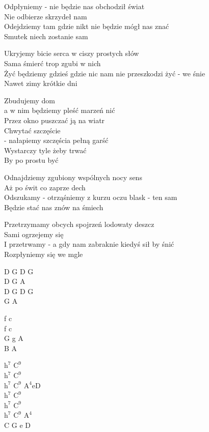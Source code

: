 
\begin{text}
    Odpłyniemy - nie będzie nas obchodził świat\\
    Nie odbierze skrzydeł nam\\
    Odejdziemy tam gdzie nikt nie będzie mógł nas znać\\
    Smutek niech zostanie sam

    Ukryjemy bicie serca w ciszy prostych słów\\
    Sama śmierć trop zgubi w nich\\
    Żyć będziemy gdzieś gdzie nic nam nie przeszkodzi żyć - we śnie\\
    Nawet zimy krótkie dni

    \vin Zbudujemy dom\\
    \vin a w nim będziemy pleść marzeń nić\\
    \vin Przez okno puszczać ją na wiatr\\
    \vin Chwytać szczęście\\
    \vin - nałapiemy szczęścia pełną garść\\
    \vin Wystarczy tyle żeby trwać\\
    \vin By po prostu być

    Odnajdziemy zgubiony wspólnych nocy sens\\
    Aż po świt co zaprze dech\\
    Odszukamy - otrząśniemy z kurzu oczu blask - ten sam\\
    Będzie stać nas znów na śmiech

    Przetrzymamy obcych spojrzeń lodowaty deszcz\\
    Sami ogrzejemy się\\
    I przetrwamy - a gdy nam zabraknie kiedyś sił by śnić\\
    Rozpłyniemy się we mgle
\end{text}
\begin{chord}
    D G D G\\
    D G A\\
    D G D G\\
    G A

    f c\\
    f c\\
    G g A\\
    B A

    $\mathrm{h^7}$ $\mathrm{C^9}$\\
    $\mathrm{h^7}$ $\mathrm{C^9}$\\
    $\mathrm{h^{7}}$ $\mathrm{C^{9}}$ $\mathrm{A^{4}}$eD\\
    $\mathrm{h^7}$ $\mathrm{C^9}$\\
    $\mathrm{h^7}$ $\mathrm{C^9}$\\
    $\mathrm{h^7}$ $\mathrm{C^9}$ $\mathrm{A^4}$\\
    C G e D
\end{chord}
